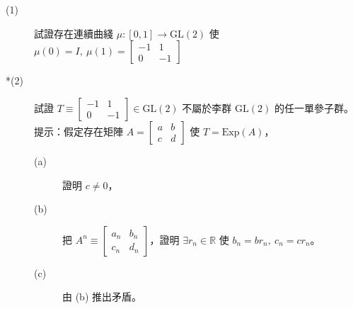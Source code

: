\documentclass{article}
\begin{document}
\section{}
\begin{description}
  \item[(1)] 試證存在連續曲綫 $\mu:[0,1]\to\mathrm{GL}(2)$ 使 $\mu(0)=I,\ \mu(1)=\begin{bmatrix}  -1 &1 \\  0& -1 \end{bmatrix}$
  \item[*(2)] 試證 $T\equiv\begin{bmatrix}  -1 &1 \\  0& -1 \end{bmatrix}\in\mathrm{GL}(2)$ 不屬於李群 $\mathrm{GL}(2)$ 的任一單參子群。提示：假定存在矩陣 $A=\begin{bmatrix}  a &b \\  c& d \end{bmatrix}$ 使 $T=\mathrm{Exp}(A)$，\begin{description}
      \item[(a)] 證明 $c\neq 0$，
      \item[(b)] 把 $A^n\equiv\begin{bmatrix}  a_n &b_n \\  c_n& d_n \end{bmatrix}$，證明 $\exists r_n\in\mathbb{R}$ 使 $b_n=br_n,\ c_n=cr_n$。
      \item[(c)] 由 (b) 推出矛盾。
    \end{description}
\end{description}
\end{document}
